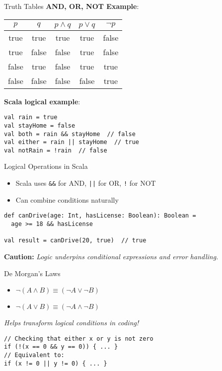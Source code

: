 \documentclass{beamer}
\newcommand{\caution}[1]{\vspace{0.5em}\textbf{Caution:} \textit{#1}}
\begin{document}
\begin{frame}{Truth Tables}
\textbf{AND, OR, NOT Example}:

\begin{center}
\begin{tabular}{|c|c|c|c|c|}
\hline
$p$ & $q$ & $p \wedge q$ & $p \vee q$ & $\neg p$ \\
\hline
true & true & true & true & false \\
true & false & false & true & false \\
false & true & false & true & true \\
false & false & false & false & true \\
\hline
\end{tabular}
\end{center}

\textbf{Scala logical example}:
\begin{lstlisting}
val rain = true
val stayHome = false
val both = rain && stayHome  // false
val either = rain || stayHome  // true
val notRain = !rain  // false
\end{lstlisting}
\end{frame}

\begin{frame}{Logical Operations in Scala}
\begin{itemize}
    \item Scala uses \texttt{\&\&} for AND, \texttt{||} for OR, \texttt{!} for NOT
    \item Can combine conditions naturally
\end{itemize}

\begin{lstlisting}
def canDrive(age: Int, hasLicense: Boolean): Boolean = 
  age >= 18 && hasLicense

val result = canDrive(20, true)  // true
\end{lstlisting}

\caution{Logic underpins conditional expressions and error handling.}
\end{frame}

\begin{frame}{De Morgan's Laws}
\begin{itemize}
    \item $\neg(A \wedge B) \equiv (\neg A \vee \neg B)$
    \item $\neg(A \vee B) \equiv (\neg A \wedge \neg B)$
\end{itemize}

\textit{Helps transform logical conditions in coding!}

\begin{lstlisting}
// Checking that either x or y is not zero
if (!(x == 0 && y == 0)) { ... }
// Equivalent to:
if (x != 0 || y != 0) { ... }
\end{lstlisting}
\end{frame}
\end{document}
